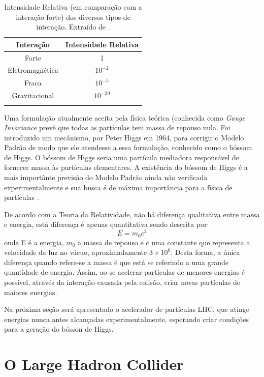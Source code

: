 \begin{table}
\centering
\begin{tabular}{cc}
\hline
\textbf{Interação} & \textbf{Intensidade Relativa} \\
\hline
Forte & 1 \\
Eletromagnética & $10^{-2}$ \\
Fraca & $10^{-5}$ \\
Gravitacional & $10^{-39}$ \\
\hline
\label{tab:interacoes}
\end{tabular}
\caption{Intensidade Relativa (em comparação com a interação forte) dos diversos
tipos de interação. Extraído de \cite{tese_eduardo}.}
\end{table}

Uma formulação atualmente aceita pela física teórica (conhecida como \emph{Gauge
Invariance} prevê que todas as partículas tem massa de repouso nula. Foi
introduzido um mecânismo, por Peter Higgs em 1964, para corrigir o Modelo Padrão de modo que ele atendesse
a essa formulação, conhecido como o bóssom de Higgs. O bóssom de Higgs seria
uma partícula mediadora responsável de fornecer massa às partículas elementares.
A existência do bóssom de Higgs é a mais importânte previsão do Modelo Padrão
ainda não verificada experimentalmente e sua busca é de máxima importância para
a física de partículas \cite{tese_eduardo}.

De acordo com a Teoria da Relatividade, não há diferença qualitativa entre
massa e energia, está diferença é apenas quantitativa \cite{einstein} sendo descrita por:
\begin{equation}
E=m_0c^2
\end{equation}
onde E é a energia, $m_0$ a massa de repouso e c uma constante que representa a
velocidade da luz no vácuo, aproximadamente $3\times 10^{8}$. Desta forma, a
única diferença quando refere-se a massa é que está se referindo a uma grande
quantidade de energia. Assim, ao se acelerar partículas de menores energias é
possível, através da interação causada pela colisão, criar novas partículas de
maiores energias.

Na próxima seção será apresentado o acelerador de partículas LHC, que 
atinge energias nunca antes alcançadas experimentalmente,
esperando criar condições para a geração do bósson de Higgs.

\section{O Large Hadron Collider}
\label{sec:lhc}

